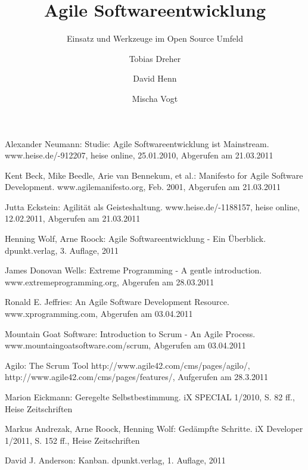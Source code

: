 \documentclass[german,english]{header}
\begin{document}

\title{Agile Softwareentwicklung}
\subtitle{Einsatz und Werkzeuge im Open Source Umfeld}
\author{Tobias Dreher\and David Henn\and Mischa Vogt}

\maketitle







\begin{thebibliography}{5}
Alexander Neumann:
Studie: Agile Softwareentwicklung ist Mainstream.
www.heise.de/-912207, heise online, 25.01.2010, Abgerufen am 21.03.2011

Kent Beck, Mike Beedle, Arie van Bennekum, et al.: 
Manifesto for Agile Software Development.
www.agilemanifesto.org, Feb. 2001, Abgerufen am 21.03.2011

Jutta Eckstein: 
Agilität als Geisteshaltung.
www.heise.de/-1188157, heise online, 12.02.2011, Abgerufen am 21.03.2011

Henning Wolf, Arne Roock: 
Agile Softwareentwicklung - Ein Überblick.
dpunkt.verlag, 3. Auflage, 2011

James Donovan Wells: 
Extreme Programming - A gentle introduction.
www.extremeprogramming.org, Abgerufen am 28.03.2011

Ronald E. Jeffries: 
An Agile Software Development Resource.
www.xprogramming.com, Abgerufen am 03.04.2011

Mountain Goat Software: 
Introduction to Scrum - An Agile Process.
www.mountaingoatsoftware.com/scrum, Abgerufen am 03.04.2011

Agilo: The Scrum Tool
http://www.agile42.com/cms/pages/agilo/,
http://www.agile42.com/cms/pages/features/,
Aufgerufen am 28.3.2011

Marion Eickmann: 
Geregelte Selbstbestimmung.
iX SPECIAL 1/2010, S. 82 ff., Heise Zeitschriften

Markus Andrezak, Arne Roock, Henning Wolf: 
Gedämpfte Schritte.
iX Developer 1/2011, S. 152 ff., Heise Zeitschriften

David J. Anderson: 
Kanban.
dpunkt.verlag, 1. Auflage, 2011


\end{thebibliography}
\end{document}
